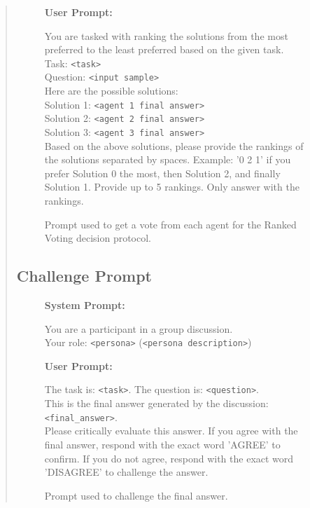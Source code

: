 \documentclass[11pt]{article}
\begin{document}
\begin{abstract}
\begin{figure}[H]
\begin{combinedprompt}
    \textbf{User Prompt:} \\
    \begingroup
    \colorbox{usercolor}{\parbox{\dimexpr\linewidth-2\fboxsep\relax}{
    You are tasked with ranking the solutions from the most preferred to the least preferred based on the given task.\\
    Task: \texttt{<task>}\\
    Question: \texttt{<input sample>}\\
    Here are the possible solutions:\\
    Solution 1: \texttt{<agent 1 final answer>}\\
    Solution 2: \texttt{<agent 2 final answer>}\\
    Solution 3: \texttt{<agent 3 final answer>}\\
    Based on the above solutions, please provide the rankings of the solutions separated by spaces. Example: '0 2 1' if you prefer Solution 0 the most, then Solution 2, and finally Solution 1. Provide up to 5 rankings. Only answer with the rankings.
    }}
    \endgroup
\end{combinedprompt}
    \caption{Prompt used to get a vote from each agent for the Ranked Voting decision protocol.}
    \label{fig:ranked_voting_prompt}
\end{figure}







\subsection{Challenge Prompt}
\label{app:challenge_prompt}
\begin{figure}[H]
    \centering
    \begin{combinedprompt}
    \textbf{System Prompt:} \\
    \begingroup
    \colorbox{systemcolor}{\parbox{\dimexpr\linewidth-2\fboxsep\relax}{
    You are a participant in a group discussion. \\
    Your role: \texttt{<persona>} (\texttt{<persona description>})
    }}
    \endgroup

    \vspace{0.4em} %

    \textbf{User Prompt:} \\
    \begingroup
    \colorbox{usercolor}{\parbox{\dimexpr\linewidth-2\fboxsep\relax}{
    The task is: \texttt{<task>}. The question is: \texttt{<question>}. \\
    This is the final answer generated by the discussion: \texttt{<final\_answer>}. \\
    Please critically evaluate this answer. If you agree with the final answer, respond with the exact word 'AGREE' to confirm. If you do not agree, respond with the exact word 'DISAGREE' to challenge the answer.
    }}
    \endgroup
\end{combinedprompt}
    \caption{Prompt used to challenge the final answer.}
    \label{fig:challenge_prompt}
\end{figure}


\end{abstract}
\end{document}
